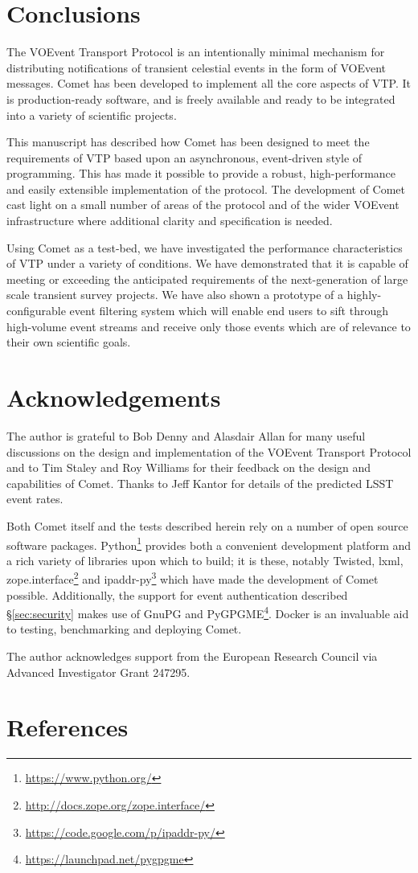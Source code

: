 \documentclass[5p,authoryear]{elsarticle}
\begin{document}
\section{Conclusions}
\label{sec:conclusions}

The VOEvent Transport Protocol is an intentionally minimal mechanism for
distributing notifications of transient celestial events in the form of
VOEvent messages. Comet has been developed to implement all the core aspects
of VTP\@. It is production-ready software, and is freely available and ready to
be integrated into a variety of scientific projects.

This manuscript has described how Comet has been designed to meet the
requirements of VTP based upon an asynchronous, event-driven style of
programming. This has made it possible to provide a robust, high-performance
and easily extensible implementation of the protocol. The development of Comet
cast light on a small number of areas of the protocol and of the wider VOEvent
infrastructure where additional clarity and specification is needed.

Using Comet as a test-bed, we have investigated the performance characteristics
of VTP under a variety of conditions. We have demonstrated that it is capable
of meeting or exceeding the anticipated requirements of the next-generation of
large scale transient survey projects. We have also shown a prototype of a
highly-configurable event filtering system which will enable end users to
sift through high-volume event streams and receive only those events which are
of relevance to their own scientific goals.

\section{Acknowledgements}
\label{sec:ack}

The author is grateful to Bob Denny and Alasdair Allan for many useful
discussions on the design and implementation of the VOEvent Transport Protocol
and to Tim Staley and Roy Williams for their feedback on the design and
capabilities of Comet. Thanks to Jeff Kantor for details of the predicted LSST
event rates.

Both Comet itself and the tests described herein rely on a number of open
source software packages.  Python\footnote{\url{https://www.python.org/}}
provides both a convenient development platform and a rich variety of
libraries upon which to build; it is these, notably Twisted, lxml,
zope.interface\footnote{\url{http://docs.zope.org/zope.interface/}} and
ipaddr-py\footnote{\url{https://code.google.com/p/ipaddr-py/}} which have made
the development of Comet possible. Additionally, the support for event
authentication described \S\ref{sec:security} makes use of GnuPG and
PyGPGME\footnote{\url{https://launchpad.net/pygpgme}}. Docker is an invaluable
aid to testing, benchmarking and deploying Comet.

The author acknowledges support from the European Research Council via
Advanced Investigator Grant 247295.

\section*{References}



\end{document}
